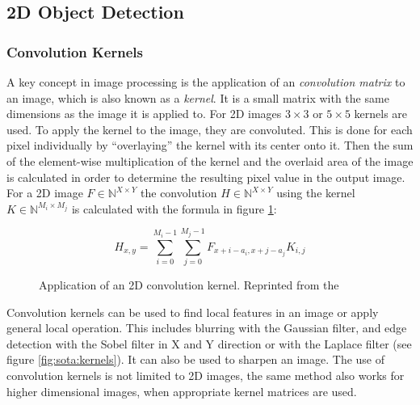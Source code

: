 \subsection{2D Object Detection}

\subsubsection{Convolution Kernels}

A key concept in image processing is the application of an \emph{convolution matrix} to an image, which is also known as a \emph{kernel}. 
It is a small matrix with the same dimensions as the image it is applied to. 
For \ac{2D} images $ 3 \times 3 $ or $5 \times 5 $ kernels are used. 
To apply the kernel to the image, they are convoluted.
This is done for each pixel individually by \enquote{overlaying} the kernel with its center onto it. 
Then the sum of the element-wise multiplication of the kernel and the overlaid area of the image is calculated in order to determine the resulting pixel value in the output image.
For a \ac{2D} image $ F \in \mathbb{N}^{X \times Y} $ the convolution $ H \in \mathbb{N}^{X \times Y} $ using the kernel $ K \in \mathbb{N}^{M_i \times M_j} $ is calculated with the formula in figure \ref{fig:sota:convolution}:

\begin{figure}[h!]
\begin{equation*}
H_{x,y} = \sum_{i=0}^{M_i-1} \sum_{j=0}^{M_j-1} F_{x+i-a_i, x+j-a_j}K_{i,j}
\end{equation*}
\caption[Application of an 2D convolution kernel]{Application of an 2D convolution kernel. Reprinted from the \textcite[][]{opencv2018kernel}}
\label{fig:sota:convolution}
\end{figure}

Convolution kernels can be used to find local features in an image or apply general local operation.
This includes blurring with the Gaussian filter, and edge detection with the Sobel filter in X and Y direction or with the Laplace filter (see figure \ref{fig:sota:kernels}).
It can also be used to sharpen an image. 
The use of convolution kernels is not limited to \ac{2D} images, 
the same method also works for higher dimensional images, 
when appropriate kernel matrices are used.


